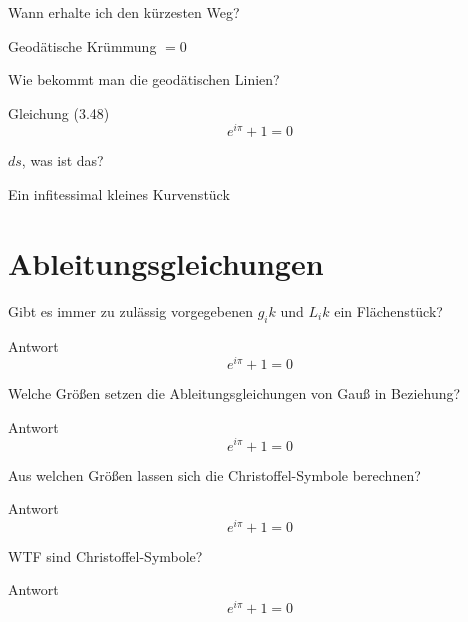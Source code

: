 \documentclass[twocolumn, fontsize=8pt, DIV=1]{scrartcl}
\begin{document}
\begin{framed}
    Wann erhalte ich den kürzesten Weg?
\end{framed}
Geodätische Krümmung $= 0$



\begin{framed}
    Wie bekommt man die geodätischen Linien?
\end{framed}
Gleichung (3.48)
\[
    e^{i\pi} + 1 = 0
\]



\begin{framed}
    $ds$, was ist das?
\end{framed}
Ein infitessimal kleines Kurvenstück











\section{Ableitungsgleichungen}


\begin{framed}
    Gibt es immer zu zulässig vorgegebenen $g_ik$ und $L_ik$ ein Flächenstück?
\end{framed}
Antwort
\[
    e^{i\pi} + 1 = 0
\]



\begin{framed}
    Welche Größen setzen die Ableitungsgleichungen von Gauß in Beziehung?
\end{framed}
Antwort
\[
    e^{i\pi} + 1 = 0
\]



\begin{framed}
    Aus welchen Größen lassen sich die Christoffel-Symbole berechnen?
\end{framed}
Antwort
\[
    e^{i\pi} + 1 = 0
\]



\begin{framed}
    WTF sind Christoffel-Symbole?
\end{framed}
Antwort
\[
    e^{i\pi} + 1 = 0
\]
\end{document}
